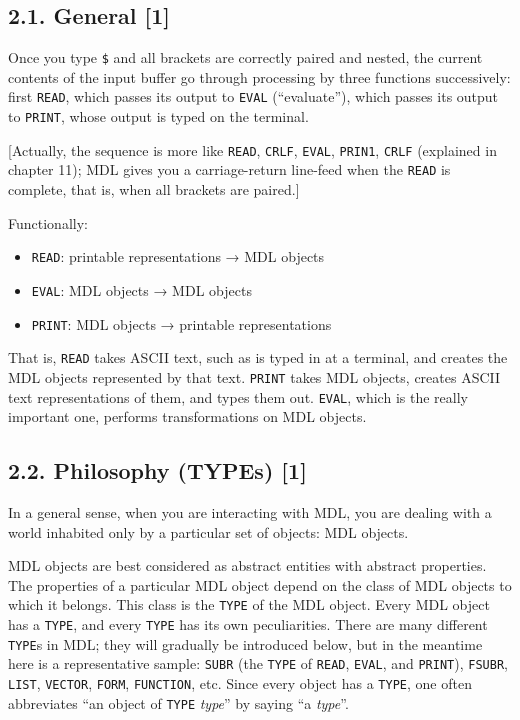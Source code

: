 \documentclass[a4paper,]{article}
\providecommand{\tightlist}{%
  \setlength{\itemsep}{0pt}\setlength{\parskip}{0pt}}
\begin{document}
\subsection{2.1. General {[}1{]}}\label{general-1}

Once you type \texttt{\$} and all brackets are correctly paired and nested, the current contents of the input buffer go
through processing by three functions successively: first \texttt{READ}, which passes its output to
\texttt{EVAL} (``evaluate''), which passes its output to
\texttt{PRINT}, whose output is typed on the terminal.

{[}Actually, the sequence is more like \texttt{READ}, \texttt{CRLF}, \texttt{EVAL}, \texttt{PRIN1}, \texttt{CRLF}
(explained in chapter 11); MDL gives you a carriage-return line-feed when the \texttt{READ} is complete, that is, when all
brackets are paired.{]}

Functionally:

\begin{itemize}
\tightlist
\item
  \texttt{READ}: printable representations → MDL objects
\item
  \texttt{EVAL}: MDL objects → MDL objects
\item
  \texttt{PRINT}: MDL objects → printable representations
\end{itemize}

That is, \texttt{READ} takes ASCII text, such as is typed in at a terminal, and creates the MDL objects represented by that
text. \texttt{PRINT} takes MDL objects, creates ASCII text representations of them, and types them out. \texttt{EVAL},
which is the really important one, performs transformations on MDL objects.

\subsection{2.2. Philosophy (TYPEs) {[}1{]}}\label{philosophy-types-1}

In a general sense, when you are interacting with MDL, you are dealing with a world inhabited only by a particular set of
objects: MDL objects.

MDL objects are best considered as abstract entities with abstract properties. The properties of a particular MDL object
depend on the class of MDL objects to which it belongs. This class is the \texttt{TYPE} of the
MDL object. Every MDL object has a \texttt{TYPE}, and every \texttt{TYPE} has its own peculiarities. There are many
different \texttt{TYPE}s in MDL; they will gradually be introduced below, but in the meantime here is a representative
sample: \texttt{SUBR} (the \texttt{TYPE} of \texttt{READ}, \texttt{EVAL}, and \texttt{PRINT}), \texttt{FSUBR},
\texttt{LIST}, \texttt{VECTOR}, \texttt{FORM}, \texttt{FUNCTION}, etc. Since every object has a \texttt{TYPE}, one often
abbreviates ``an object of \texttt{TYPE} \emph{type}'' by saying ``a \emph{type}''.
\end{document}
